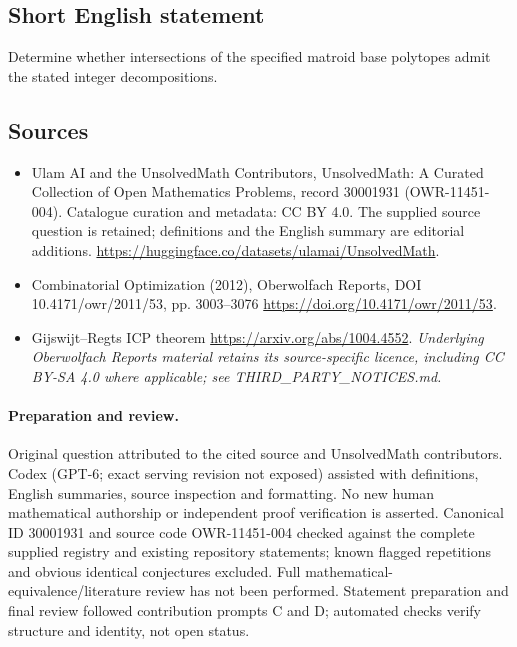 \documentclass[11pt]{article}
\begin{document}
\subsection{Short English statement}
Determine whether intersections of the specified matroid base polytopes admit the stated integer decompositions.
\subsection{Sources}
\begin{itemize}
\item[\hypertarget{source:30001931:1}{S1}] Ulam AI and the UnsolvedMath Contributors, UnsolvedMath: A Curated Collection of Open Mathematics Problems, record 30001931 (OWR-11451-004). Catalogue curation and metadata: CC BY 4.0. The supplied source question is retained; definitions and the English summary are editorial additions.
\url{https://huggingface.co/datasets/ulamai/UnsolvedMath}.
\item[\hypertarget{source:30001931:2}{S2}] Combinatorial Optimization (2012), Oberwolfach Reports, DOI 10.4171/owr/2011/53, pp. 3003--3076
\url{https://doi.org/10.4171/owr/2011/53}.
\item[\hypertarget{source:30001931:3}{S3}] Gijswijt--Regts ICP theorem
\url{https://arxiv.org/abs/1004.4552}.
\textit{Underlying Oberwolfach Reports material retains its source-specific licence, including CC BY-SA 4.0 where applicable; see THIRD\_PARTY\_NOTICES.md.}
\end{itemize}
\paragraph{Preparation and review.}
Original question attributed to the cited source and UnsolvedMath contributors. Codex (GPT-6; exact serving revision not exposed) assisted with definitions, English summaries, source inspection and formatting. No new human mathematical authorship or independent proof verification is asserted. Canonical ID 30001931 and source code OWR-11451-004 checked against the complete supplied registry and existing repository statements; known flagged repetitions and obvious identical conjectures excluded. Full mathematical-equivalence/literature review has not been performed. Statement preparation and final review followed contribution prompts C and D; automated checks verify structure and identity, not open status.
\label{end:30001931}
\end{document}
